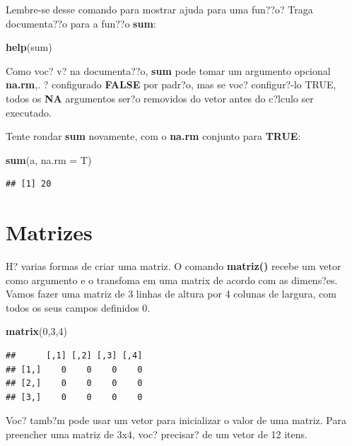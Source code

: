 \documentclass[]{book}
\newenvironment{Shaded}{\begin{snugshade}}{\end{snugshade}}
\newcommand{\DataTypeTok}[1]{\textcolor[rgb]{0.13,0.29,0.53}{#1}}
\newcommand{\DecValTok}[1]{\textcolor[rgb]{0.00,0.00,0.81}{#1}}
\newcommand{\KeywordTok}[1]{\textcolor[rgb]{0.13,0.29,0.53}{\textbf{#1}}}
\newcommand{\NormalTok}[1]{#1}
\begin{document}
Lembre-se desse comando para mostrar ajuda para uma fun??o? Traga documenta??o para a fun??o \textbf{sum}:

\begin{Shaded}
\begin{Highlighting}[]
\KeywordTok{help}\NormalTok{(sum)}
\end{Highlighting}
\end{Shaded}

Como voc? v? na documenta??o, \textbf{sum} pode tomar um argumento opcional \textbf{na.rm},. ? configurado \textbf{FALSE} por padr?o, mas se voc? configur?-lo TRUE, todos os \textbf{NA} argumentos ser?o removidos do vetor antes do c?lculo ser executado.

Tente rondar \textbf{sum} novamente, com o \textbf{na.rm} conjunto para \textbf{TRUE}:

\begin{Shaded}
\begin{Highlighting}[]
\KeywordTok{sum}\NormalTok{(a, }\DataTypeTok{na.rm =}\NormalTok{ T)}
\end{Highlighting}
\end{Shaded}

\begin{verbatim}
## [1] 20
\end{verbatim}

\hypertarget{matrizes}{%
\section{Matrizes}\label{matrizes}}

H? varias formas de criar uma matriz. O comando \textbf{matriz()} recebe um vetor como argumento e o transfoma em uma matrix de acordo com as dimens?es.
Vamos fazer uma matriz de 3 linhas de altura por 4 colunas de largura, com todos os seus campos definidos 0.

\begin{Shaded}
\begin{Highlighting}[]
\KeywordTok{matrix}\NormalTok{(}\DecValTok{0}\NormalTok{,}\DecValTok{3}\NormalTok{,}\DecValTok{4}\NormalTok{)}
\end{Highlighting}
\end{Shaded}

\begin{verbatim}
##      [,1] [,2] [,3] [,4]
## [1,]    0    0    0    0
## [2,]    0    0    0    0
## [3,]    0    0    0    0
\end{verbatim}

Voc? tamb?m pode usar um vetor para inicializar o valor de uma matriz. Para preencher uma matriz de 3x4, voc? precisar? de um vetor de 12 itens.
\end{document}
